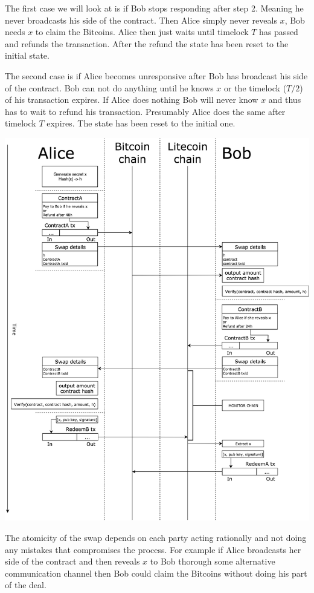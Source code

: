 The first case we will look at is if Bob stops responding after step 2. Meaning he never broadcasts his side of the contract. Then Alice simply never reveals $x$, Bob needs $x$ to claim the Bitcoins. Alice then just waits until timelock $T$ has passed and refunds the transaction. After the refund the state has been reset to the initial state.

The second case is if Alice becomes unresponsive after Bob has broadcast his side of the contract. Bob can not do anything until he knows $x$ or the timelock ($T/2$) of his transaction expires. If Alice does nothing Bob will never know $x$ and thus has to wait to refund his transaction. Presumably Alice does the same after timelock $T$ expires. The state has been reset to the initial one.

\newpage
\centerline{\includegraphics[width=1.35\textwidth]{background/images/atomic_swap_flow_large.png}}
\newpage

The atomicity of the swap depends on each party acting rationally and not doing any mistakes that compromises the process. For example if Alice broadcasts her side of the contract and then reveals $x$ to Bob thorough some alternative communication channel then Bob could claim the Bitcoins without doing his part of the deal. 


